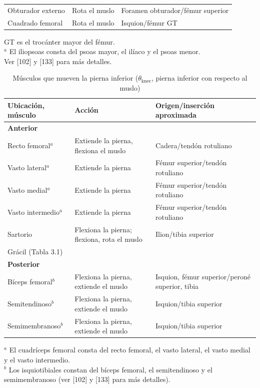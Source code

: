 \documentclass[12pt]{book}
\begin{document}
\begin{table}[htbp]
\begin{tabularx}{\textwidth}{XXX}
Obturador externo & Rota el muslo & Foramen obturador/fémur superior \\
Cuadrado femoral & Rota el muslo & Isquion/fémur GT \\
\bottomrule
\end{tabularx}
\begin{flushleft}
    \small GT es el trocánter mayor del fémur. \\
    $^a$ El iliopsoas consta del psoas mayor, el ilíaco y el psoas menor. \\
    Ver [102] y [133] para más detalles.
\end{flushleft}
\end{table}

\begin{table}[htbp]
\centering
\caption{Músculos que mueven la pierna inferior ($\theta_{\text{knee}}$, pierna inferior con respecto al muslo)}
\label{tab:32}
\begin{tabularx}{\textwidth}{XXX}
\toprule
\textbf{Ubicación, músculo} & \textbf{Acción} & \textbf{Origen/inserción aproximada} \\
\midrule
\textbf{Anterior} & & \\
Recto femoral$^a$ & Extiende la pierna, flexiona el muslo & Cadera/tendón rotuliano \\
Vasto lateral$^a$ & Extiende la pierna & Fémur superior/tendón rotuliano \\
Vasto medial$^a$ & Extiende la pierna & Fémur superior/tendón rotuliano \\
Vasto intermedio$^a$ & Extiende la pierna & Fémur superior/tendón rotuliano \\
Sartorio & Flexiona la pierna; flexiona, rota el muslo & Ilion/tibia superior \\
Grácil (Tabla 3.1) & & \\
\midrule
\textbf{Posterior} & & \\
Bíceps femoral$^b$ & Flexiona la pierna, extiende el muslo & Isquion, fémur superior/peroné superior, tibia \\
Semitendinoso$^b$ & Flexiona la pierna, extiende el muslo & Isquion/tibia superior \\
Semimembranoso$^b$ & Flexiona la pierna, extiende el muslo & Isquion/tibia superior \\
\bottomrule
\end{tabularx}
\begin{flushleft}
    \small $^a$ El cuadríceps femoral consta del recto femoral, el vasto lateral, el vasto medial y el vasto intermedio. \\
    $^b$ Los isquiotibiales constan del bíceps femoral, el semitendinoso y el semimembranoso (ver [102] y [133] para más detalles).
\end{flushleft}
\end{table}
\end{document}
